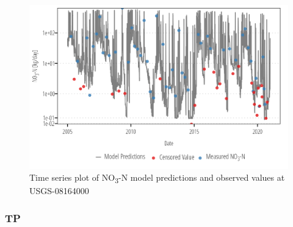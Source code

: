 \documentclass[
]{article}
\begin{document}
\begin{figure}[h]

{\centering \includegraphics{model_assessment_files/figure-pdf/unnamed-chunk-7-1.png}

}

\caption{Time series plot of NO\textsubscript{3}-N model predictions and
observed values at USGS-08164000}

\end{figure}

\clearpage

\hypertarget{tp}{%
\subsubsection{TP}\label{tp}}
\end{document}
